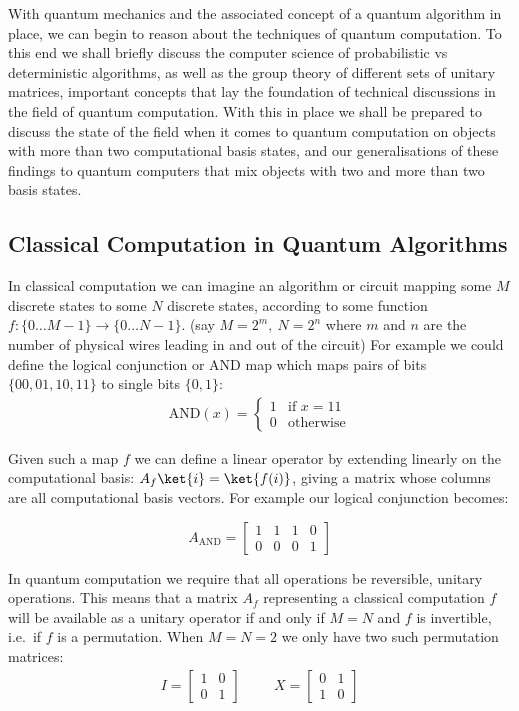 With quantum mechanics and the associated concept of a quantum algorithm in place, we can begin to reason about the techniques of quantum computation. To this end we shall briefly discuss the computer science of probabilistic vs deterministic algorithms, as well as the group theory of different sets of unitary matrices, important concepts that lay the foundation of technical discussions in the field of quantum computation. With this in place we shall be prepared to discuss the state of the field when it comes to quantum computation on objects with more than two computational basis states, and our generalisations of these findings to quantum computers that mix objects with two and more than two basis states.

\subsection{Classical Computation in Quantum Algorithms}
In classical computation we can imagine an algorithm or circuit mapping some $M$ discrete states to some $N$ discrete states, according to some function $f: \{0\dots M-1\} \to \{0\dots N-1\}$. (say $M = 2^m,\ N = 2^n$ where $m$ and $n$ are the number of physical wires leading in and out of the circuit) For example we could define the logical conjunction or AND map which maps pairs of bits $\{00, 01, 10, 11\}$ to single bits $\{0, 1\}$: 
\begin{align*}
	\text{AND}(x) = \begin{cases}
		1 & \text{if\ } x = 11\\
		0 & \text{otherwise}
	\end{cases}
\end{align*}

Given such a map $f$ we can define a linear operator by extending linearly on the computational basis: $A_f\ket{i} = \ket{f(i)}$, giving a matrix whose columns are all computational basis vectors. For example our logical conjunction becomes:

\[
A_\text{AND} = \left[\begin{matrix}
	1&1&1&0\\
	0&0&0&1
\end{matrix}\right]
\]

In quantum computation we require that all operations be reversible, unitary operations. This means that a matrix $A_f$ representing a classical computation $f$ will be available as a unitary operator if and only if $M=N$ and $f$ is invertible, i.e.\ if $f$ is a permutation. When $M = N = 2$ we only have two such permutation matrices:
\begin{align*}
	I = \left[\begin{matrix}
		1&0\\
		0&1
	\end{matrix}\right]
	&&&
	X = \left[\begin{matrix}
		0&1\\
		1&0
	\end{matrix}\right]
\end{align*}

